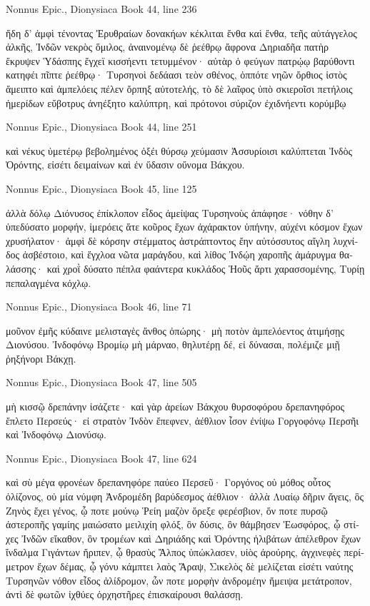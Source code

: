\documentclass[12pt,letterpaper,twoside,final]{memoir}
\begin{document}
\begin{greek}
Nonnus Epic., Dionysiaca 
Book 44, line 236

ἤδη δ' ἀμφὶ τένοντας Ἐρυθραίων δονακήων 
κέκλιται ἔνθα καὶ ἔνθα, τεῆς αὐτάγγελος ἀλκῆς,   
Ἰνδῶν νεκρὸς ὅμιλος, ἀναινομένῳ δὲ ῥεέθρῳ 
ἄφρονα Δηριαδῆα πατὴρ ἔκρυψεν Ὑδάσπης 
ἔγχεϊ κισσήεντι τετυμμένον· αὐτὰρ ὁ φεύγων 
πατρῴῳ βαρύθοντι κατηφέι πῖπτε ῥεέθρῳ· 
Τυρσηνοὶ δεδάασι τεὸν σθένος, ὁππότε νηῶν 
ὄρθιος ἱστὸς ἄμειπτο καὶ ἀμπελόεις πέλεν ὄρπηξ 
αὐτοτελής, τὸ δὲ λαῖφος ὑπὸ σκιεροῖσι πετήλοις 
ἡμερίδων εὔβοτρυς ἀνηέξητο καλύπτρη, 
καὶ πρότονοι σύριζον ἐχιδνήεντι κορύμβῳ 




Nonnus Epic., Dionysiaca 
Book 44, line 251

καὶ νέκυς ὑμετέρῳ βεβολημένος ὀξέι θύρσῳ 
χεύμασιν Ἀσσυρίοισι καλύπτεται Ἰνδὸς Ὀρόντης, 
εἰσέτι δειμαίνων καὶ ἐν ὕδασιν οὔνομα Βάκχου. 



Nonnus Epic., Dionysiaca 
Book 45, line 125

ἀλλὰ δόλῳ Διόνυσος ἐπίκλοπον εἶδος ἀμείψας 
Τυρσηνοὺς ἀπάφησε· νόθην δ' ὑπεδύσατο μορφήν, 
ἱμερόεις ἅτε κοῦρος ἔχων ἀχάρακτον ὑπήνην, 
αὐχένι κόσμον ἔχων χρυσήλατον· ἀμφὶ δὲ κόρσην 
στέμματος ἀστράπτοντος ἔην αὐτόσσυτος αἴγλη 
λυχνίδος ἀσβέστοιο, καὶ ἔγχλοα νῶτα μαράγδου, 
καὶ λίθος Ἰνδῴη χαροπῆς ἀμάρυγμα θαλάσσης· 
καὶ χροῒ δύσατο πέπλα φαάντερα κυκλάδος Ἠοῦς 
ἄρτι χαρασσομένης, Τυρίῃ πεπαλαγμένα κόχλῳ. 



Nonnus Epic., Dionysiaca 
Book 46, line 71

μοῦνον ἐμῆς κύδαινε μελισταγὲς ἄνθος ὀπώρης· 
μὴ ποτὸν ἀμπελόεντος ἀτιμήσῃς Διονύσου. 
Ἰνδοφόνῳ Βρομίῳ μὴ μάρναο, θηλυτέρῃ δέ, 
εἰ δύνασαι, πολέμιζε μιῇ ῥηξήνορι Βάκχῃ. 



Nonnus Epic., Dionysiaca 
Book 47, line 505

μὴ κισσῷ δρεπάνην ἰσάζετε· καὶ γὰρ ἀρείων 
Βάκχου θυρσοφόρου δρεπανηφόρος ἔπλετο Περσεύς· 
εἰ στρατὸν Ἰνδὸν ἔπεφνεν, ἀέθλιον ἶσον ἐνίψω 
Γοργοφόνῳ Περσῆι καὶ Ἰνδοφόνῳ Διονύσῳ. 



Nonnus Epic., Dionysiaca 
Book 47, line 624

καὶ σὺ μέγα φρονέων δρεπανηφόρε παύεο Περσεῦ· 
Γοργόνος οὐ μόθος οὗτος ὀλίζονος, οὐ μία νύμφη 
Ἀνδρομέδη βαρύδεσμος ἀέθλιον· ἀλλὰ Λυαίῳ 
δῆριν ἄγεις, ὃς Ζηνὸς ἔχει γένος, ᾧ ποτε μούνῳ 
Ῥείη μαζὸν ὄρεξε φερέσβιον, ὅν ποτε πυρσῷ 
ἀστεροπῆς γαμίης μαιώσατο μειλιχίη φλόξ, 
ὃν δύσις, ὃν θάμβησεν Ἑωσφόρος, ᾧ στίχες Ἰνδῶν 
εἴκαθον, ὃν τρομέων καὶ Δηριάδης καὶ Ὀρόντης 
ἠλιβάτων ἀπέλεθρον ἔχων ἴνδαλμα Γιγάντων 
ἤριπεν, ᾧ θρασὺς Ἄλπος ὑπώκλασεν, υἱὸς ἀρούρης, 
ἀγχινεφὲς περίμετρον ἔχων δέμας, ᾧ γόνυ κάμπτει 
λαὸς Ἄραψ, Σικελὸς δὲ μελίζεται εἰσέτι ναύτης 
Τυρσηνῶν νόθον εἶδος ἁλίδρομον, ὧν ποτε μορφὴν 
ἀνδρομέην ἤμειψα μετάτροπον, ἀντὶ δὲ φωτῶν 
ἰχθύες ὀρχηστῆρες ἐπισκαίρουσι θαλάσσῃ. 




\end{greek}
\end{document}
